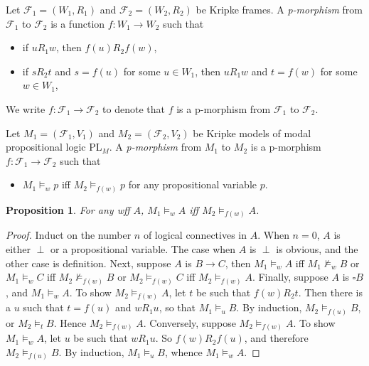 \documentclass[12pt]{article}
\newtheorem{prop}{Proposition}
\begin{document}
Let $\mathcal{F}_1=(W_1,R_1)$ and $\mathcal{F}_2=(W_2,R_2)$ be Kripke frames.  A \emph{p-morphism} from $\mathcal{F}_1$ to $\mathcal{F}_2$ is a function $f:W_1 \to W_2$ such that
\begin{itemize}
\item if $u R_1 w$, then $f(u) R_2 f(w)$,
\item if $s R_2 t$ and $s=f(u)$ for some $u\in W_1$, then $u R_1 w$ and $t=f(w)$ for some $w\in W_1$,
\end{itemize}
We write $f:\mathcal{F}_1\to \mathcal{F}_2$ to denote that $f$ is a p-morphism from $\mathcal{F}_1$ to $\mathcal{F}_2$.

Let $M_1=(\mathcal{F}_1,V_1)$ and $M_2=(\mathcal{F}_2,V_2)$ be Kripke models of modal propositional logic PL$_M$.  A \emph{p-morphism} from $M_1$ to $M_2$ is a p-morphism $f:\mathcal{F}_1\to \mathcal{F}_2$ such that
\begin{itemize}
\item $M_1 \models_w p$ iff $M_2 \models_{f(w)} p$ for any propositional variable $p$.
\end{itemize}

\begin{prop} For any wff $A$, $M_1 \models_w A$ iff $M_2 \models_{f(w)} A$. \end{prop}
\begin{proof}  Induct on the number $n$ of logical connectives in $A$.  When $n=0$, $A$ is either $\perp$ or a propositional variable.  The case when $A$ is $\perp$ is obvious, and the other case is definition.  Next, suppose $A$ is $B\to C$, then $M_1 \models_w A$ iff $M_1 \not \models_w B$ or $M_1 \models_w C$ iff $M_2 \not \models_{f(w)} B$ or $M_2 \models_{f(w)} C$ iff $M_2 \models_{f(w)} A$.  Finally, suppose $A$ is $\square B$, and $M_1 \models_w A$.  To show $M_2 \models_{f(w)} A$, let $t$ be such that $f(w) R_2 t$.  Then there is a $u$ such that $t=f(u)$ and $w R_1 u$, so that $M_1 \models_u B$.  By induction, $M_2 \models_{f(u)} B$, or $M_2 \models_t B$.  Hence $M_2 \models_{f(w)} A$.  Conversely, suppose $M_2 \models_{f(w)} A$.  To show $M_1 \models_w A$, let $u$ be such that $w R_1 u$.  So $f(w) R_2 f(u)$, and therefore $M_2 \models_{f(u)} B$.  By induction, $M_1 \models_u B$, whence $M_1 \models_w A$.
\end{proof}
\end{document}
